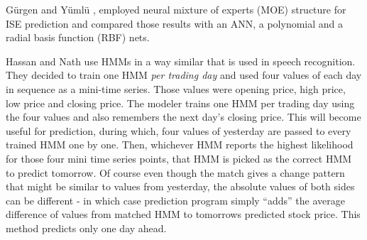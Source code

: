 Gürgen and Yümlü \cite{gurgen}, employed neural mixture of experts (MOE)
structure for ISE prediction and compared those results with an ANN, a
polynomial and a radial basis function (RBF) nets.

Hassan and Nath \cite{hassan} use HMMs in a way similar that is used in speech
recognition. They decided to train one HMM {\em per trading day} and used four
values of each day in sequence as a mini-time series. Those values were opening
price, high price, low price and closing price. The modeler trains one HMM per
trading day using the four values and also remembers the next day's closing
price. This will become useful for prediction, during which, four values of
yesterday are passed to every trained HMM one by one. Then, whichever HMM
reports the highest likelihood for those four mini time series points, that HMM
is picked as the correct HMM to predict tomorrow. Of course even though the
match gives a change pattern that might be similar to values from yesterday, the
absolute values of both sides can be different - in which case prediction
program simply ``adds'' the average difference of values from matched HMM to
tomorrows predicted stock price. This method \cite{hassan} predicts only one day
ahead.

